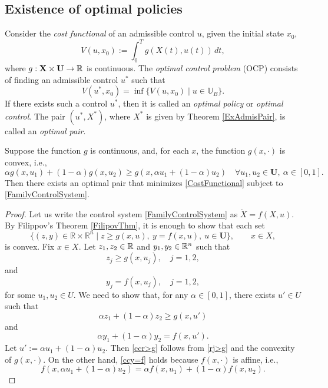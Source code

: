 \subsection{Existence of optimal policies}




Consider the  {\it cost functional} of an admissible control $u$, given the initial state $x_0$, 
        \begin{equation}\label{CostFunctional} V(u,x_0) := \int_0^Tg(X(t),u(t))\,dt,\end{equation}
where $g: \mathbf{X}\times \mathbf{U}\to \mathbb{R}$ is continuous. The {\it optimal control problem} (OCP) consists of finding an admissible control $u^\ast$ such that
\[ V(u^\ast,x_0)=\inf\{ V(u,x_0)\mid u\in \mathbb{U}_B \}.\]
If there exists such a control $u^\ast$, then it is called an {\it optimal policy} or {\it optimal control}. The pair $(u^\ast,X^\ast)$, where $X^\ast$ is given by Theorem \ref{ExAdmisPair}, is called an {\it optimal pair}.


\begin{theorem} Suppose the function $g$ is continuous, and, for each $x$,  the function $g(x,\cdot)$ is convex, i.e.,
        \[  \alpha g(x,u_1) +(1-\alpha) g(x,u_2) \geq g(x,\alpha u_1+(1-\alpha)u_2) \quad \forall u_1,u_2\in\mathbf{U},\  \alpha\in [0,1]. \]
Then there exists an optimal pair that minimizes \eqref{CostFunctional} subject to \eqref{FamilyControlSystem}. 
\end{theorem}
\begin{proof} Let us write the control system \eqref{FamilyControlSystem} as $\dot{X}=f(X,u)$. By Filippov's Theorem \ref{FilipovThm}, it is enough to show that each set   \[ 
 \{ (z, y)\in \mathbb{R}\times \mathbb{R}^n\mid  
    z \geq g(x,u), \  y=f(x,u), \ u\in \mathbf{U}\},\qquad x\in X,
     \]  
is convex. Fix $x\in X$. Let  $z_1,z_2\in \mathbb{R}$ and  $y_1,y_2\in \mathbb{R}^n$ such that
      \begin{equation}\label{rj>g}
          z_j\geq g(x,u_j),\quad   j=1,2, 
      \end{equation}
and 
    \begin{equation}\label{yj=f}
  y_j=f(x,u_j),\quad j=1,2, 
      \end{equation}
for some $u_1,u_2\in U$. We need to show that, for any $\alpha\in[0,1]$, there exists $u'\in U$ such that
    \begin{equation}\label{ccr>g}
    \alpha z_1 + (1-\alpha)z_2 \geq g(x,u') \end{equation}
and 
    \begin{equation}\label{ccy=f}
 \alpha y_1 + (1-\alpha)y_2 = f(x,u'). \end{equation}
Let $u':=\alpha u_1 + (1-\alpha)u_2$. Then \eqref{ccr>g} follows from \eqref{rj>g} and the convexity of $g(x,\cdot)$. On the other hand, \eqref{ccy=f} holds because $f(x,\cdot)$ is affine, i.e.,  
  \[ f(x,\alpha u_1+(1-\alpha)u_2) = \alpha f(x,u_1) +(1-\alpha) f(x,u_2). \]
\end{proof}


